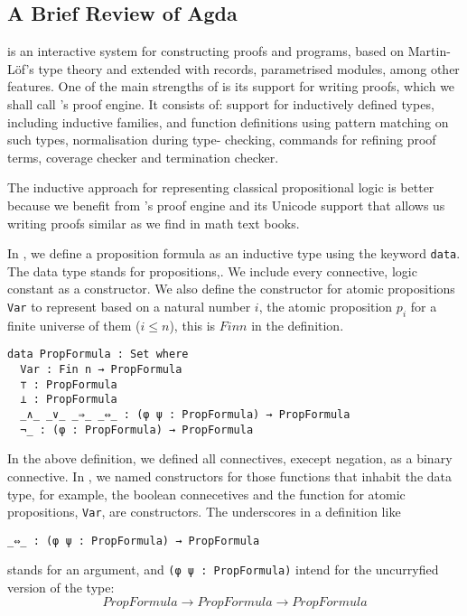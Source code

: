\documentclass[../main.tex]{subfiles}
\begin{document}


\subsection{A Brief Review of Agda}
\label{ssec:agda-definition}

\Agda is an interactive system for constructing proofs and programs,
based on Martin-L\"{o}f's type theory and extended with records, parametrised
modules, among other features.
One of the main strengths of \Agda is its support for writing proofs,
which we shall call \Agda's proof engine. It consists of: support for
inductively defined types, including inductive families, and function
definitions using pattern matching on such types, normalisation during type-
checking, commands for refining proof terms, coverage checker and termination
checker.

The inductive approach for representing classical propositional logic
is better because we benefit from \Agda's proof engine and its Unicode
support that allows us writing proofs similar as we find in math text books.

In \Agda, we define a proposition formula
as an inductive type using the keyword \texttt{data}.
The  data type stands for propositions,\cite{Altenkirch2015}.
We include every connective, logic constant as a constructor.
We also define the constructor for atomic propositions \verb!Var!
to represent based on a natural number $i$, the atomic proposition
$p_i$ for a finite universe of them ($i \leq n$), this is $Fin n$ in the
definition.

\begin{verbatim}
data PropFormula : Set where
  Var : Fin n → PropFormula
  ⊤ : PropFormula
  ⊥ : PropFormula
  _∧_ _∨_ _⇒_ _⇔_ : (φ ψ : PropFormula) → PropFormula
  ¬_ : (φ : PropFormula) → PropFormula
\end{verbatim}

\begin{remark}
In the above definition, we defined all connectives, execept negation, as
a binary connective. In \Agda, we named constructors for those functions
that inhabit the data type, for example, the boolean connecetives and
the function for atomic propositions, \verb!Var!, are constructors.
The underscores in a definition like
\begin{verbatim}
_⇔_ : (φ ψ : PropFormula) → PropFormula
\end{verbatim}
stands for an argument, and \verb!(φ ψ : PropFormula)! intend for the
uncurryfied version of the type:
$$PropFormula → PropFormula → PropFormula$$
\end{remark}
\end{document}

